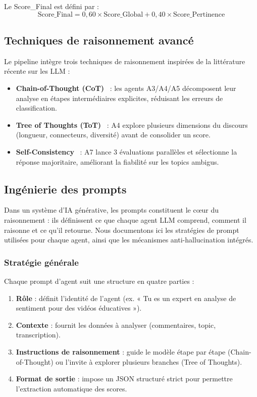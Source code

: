 \documentclass[12pt, a4paper]{article}
\begin{document}
Le Score\_Final est défini par :
\begin{equation}
  \text{Score\_Final} = 0{,}60 \times \text{Score\_Global}
                      + 0{,}40 \times \text{Score\_Pertinence}
  \label{eq:score_final}
\end{equation}

\subsection{Techniques de raisonnement avancé}

Le pipeline intègre trois techniques de raisonnement inspirées de la littérature
récente sur les LLM :

\begin{itemize}
  \item \textbf{Chain-of-Thought (CoT)}~\cite{wei2022cot} : les agents A3/A4/A5
        décomposent leur analyse en étapes intermédiaires explicites, réduisant
        les erreurs de classification.
  \item \textbf{Tree of Thoughts (ToT)}~\cite{yao2023tot} : A4 explore plusieurs
        dimensions du discours (longueur, connecteurs, diversité) avant de
        consolider un score.
  \item \textbf{Self-Consistency}~\cite{wang2023sc} : A7 lance 3 évaluations
        parallèles et sélectionne la réponse majoritaire, améliorant la fiabilité
        sur les topics ambigus.
\end{itemize}

\subsection{Ingénierie des prompts}
\label{sec:prompts}

Dans un système d'IA générative, les prompts constituent le cœur du raisonnement :
ils définissent ce que chaque agent LLM comprend, comment il raisonne et ce
qu'il retourne. Nous documentons ici les stratégies de prompt utilisées pour
chaque agent, ainsi que les mécanismes anti-hallucination intégrés.

\subsubsection{Stratégie générale}

Chaque prompt d'agent suit une structure en quatre parties :

\begin{enumerate}
  \item \textbf{Rôle} : définit l'identité de l'agent (ex. « Tu es un expert en
        analyse de sentiment pour des vidéos éducatives »).
  \item \textbf{Contexte} : fournit les données à analyser (commentaires, topic,
        transcription).
  \item \textbf{Instructions de raisonnement} : guide le modèle étape par étape
        (Chain-of-Thought) ou l'invite à explorer plusieurs branches (Tree of Thoughts).
  \item \textbf{Format de sortie} : impose un JSON structuré strict pour permettre
        l'extraction automatique des scores.
\end{enumerate}
\end{document}
